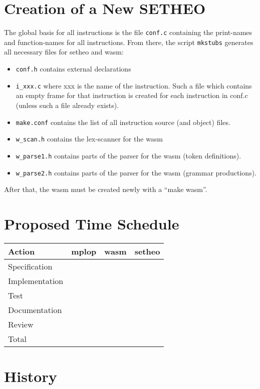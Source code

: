 \section{Creation of a New SETHEO}

The global basis for all instructions is the file {\tt conf.c}
containing the print-names and function-names for all instructions.
From there, the script {\tt mkstubs} generates all necessary files
for setheo and wasm:
\begin{itemize}
\item
{\tt conf.h} contains external declarations
\item
{\tt i\_xxx.c} where xxx is the name of the instruction.
Such a file which contains an empty frame for that instruction
is created for each instruction in conf.c (unless such a file already
exists).
\item
{\tt make.conf}
contains the list of all instruction source (and object) files.
\item
{\tt w\_scan.h}
contains the lex-scanner for the wasm
\item
{\tt w\_parse1.h}
contains parts of the parser for the wasm (token definitions).
\item
{\tt w\_parse2.h}
contains parts of the parser for the wasm (grammar productions).
\end{itemize}

After that, the wasm must be created newly with a ``make wasm''.

\section{Proposed Time Schedule}

\begin{center}
\begin{tabular}{|l|r|r|r|}
\hline\hline
Action & mplop & wasm & setheo \\
\hline
Specification & & & \\
Implementation & & & \\
Test & & & \\
Documentation & & & \\
Review & & & \\
\hline
Total & & & \\
\hline\hline
\end{tabular}
\end{center}
\section{History}

